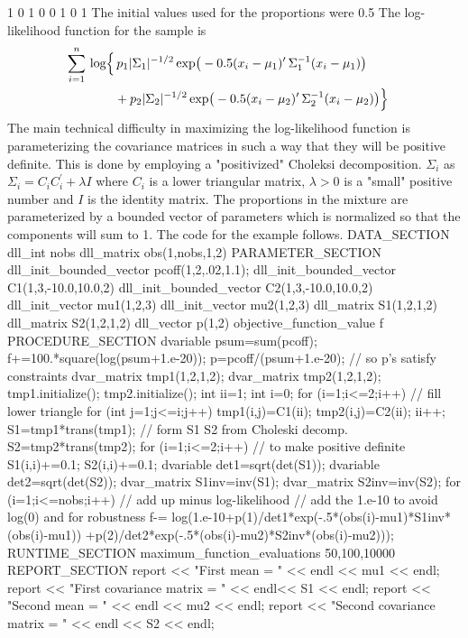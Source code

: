 {{{{{{{{    1  0     1  0
    0  1     0  1
\endexample
The initial values used for the proportions were
      0.5
\endexample
The log-likelihood  function for the sample is
 \begin{eqnarray}
  \sum_{i=1}^n \log\Big\{&\,p_1|\Sigma_1|^{-1/2}\exp\big(-0.5(x_i-\mu_1)^{\prime}\,
  \Sigma_1^{-1}(x_i-\mu_1)\big) \cr
   &+p_2|\Sigma_2|^{-1/2}\exp\big(-0.5(x_i-\mu_2)^{\prime}\,
  \Sigma_2^{-1}(x_i-\mu_2)\big)\Big\}
 \end{eqnarray}
The main technical difficulty in maximizing the log-likelihood
function is parameterizing the covariance matrices in such a way
that they will be positive definite. This is done by employing a
"positivized" Choleksi decomposition.
$\Sigma_i$ as $\Sigma_i=C_iC_i^{\prime}+\lambda I$ where
$C_i$ is a lower triangular matrix, $\lambda>0$ is a "small"
positive number  and $I$ is the identity matrix. 
The proportions in the mixture are parameterized by a bounded vector
of parameters which is normalized so that the components will sum to 1.
The code for the example follows.
\beginexample
DATA_SECTION
  dll_int nobs
  dll_matrix obs(1,nobs,1,2) 
PARAMETER_SECTION
  dll_init_bounded_vector pcoff(1,2,.02,1.1);  
  dll_init_bounded_vector C1(1,3,-10.0,10.0,2)
  dll_init_bounded_vector C2(1,3,-10.0,10.0,2)
  dll_init_vector mu1(1,2,3)
  dll_init_vector mu2(1,2,3)
  dll_matrix S1(1,2,1,2)
  dll_matrix S2(1,2,1,2)
  dll_vector p(1,2)
  objective_function_value f
PROCEDURE_SECTION
  dvariable psum=sum(pcoff);
  f+=100.*square(log(psum+1.e-20));
  p=pcoff/(psum+1.e-20);  // so p's satisfy constraints
  dvar_matrix tmp1(1,2,1,2);
  dvar_matrix tmp2(1,2,1,2);
  tmp1.initialize();
  tmp2.initialize();
  int ii=1;
  int i=0;
  for (i=1;i<=2;i++) {   // fill lower triangle
    for (int j=1;j<=i;j++) { 
      tmp1(i,j)=C1(ii);
      tmp2(i,j)=C2(ii);
      ii++;
    }
  }
  S1=tmp1*trans(tmp1); // form S1 S2 from Choleski decomp.
  S2=tmp2*trans(tmp2);
  for (i=1;i<=2;i++) {  // to make positive definite
    S1(i,i)+=0.1; 
    S2(i,i)+=0.1;
  }
  dvariable det1=sqrt(det(S1));
  dvariable det2=sqrt(det(S2));
  dvar_matrix S1inv=inv(S1);
  dvar_matrix S2inv=inv(S2);
  for (i=1;i<=nobs;i++) // add up minus log-likelihood
  {
    // add the 1.e-10 to avoid log(0) and for robustness
    f-= log(1.e-10+p(1)/det1*exp(-.5*(obs(i)-mu1)*S1inv*(obs(i)-mu1))
       +p(2)/det2*exp(-.5*(obs(i)-mu2)*S2inv*(obs(i)-mu2)));
  }  
RUNTIME_SECTION
  maximum_function_evaluations 50,100,10000
REPORT_SECTION
  report << "First mean = " << endl << mu1 << endl;
  report << "First covariance matrix = " << endl<< S1 << endl;
  report << "Second mean = " << endl << mu2 << endl;
  report << "Second covariance matrix = " << endl << S2 << endl;
\endexample

}}}}}}}}
